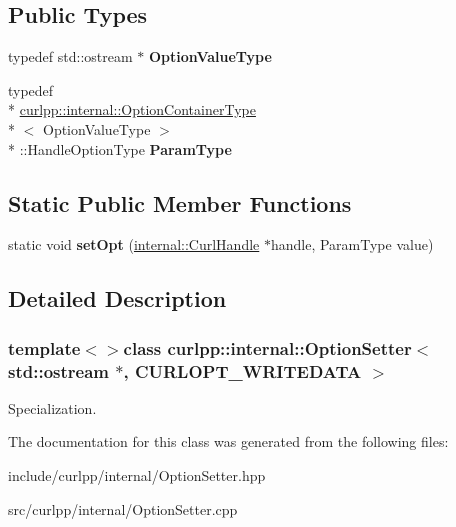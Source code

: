 \subsection*{Public Types}
\begin{DoxyCompactItemize}
\item 
\hypertarget{classcurlpp_1_1internal_1_1OptionSetter_3_01std_1_1ostream_01_5_00_01CURLOPT__WRITEDATA_01_4_a1efda9077d2d9c808c05cba30e6f5d4e}{typedef std\-::ostream $\ast$ {\bfseries Option\-Value\-Type}}\label{classcurlpp_1_1internal_1_1OptionSetter_3_01std_1_1ostream_01_5_00_01CURLOPT__WRITEDATA_01_4_a1efda9077d2d9c808c05cba30e6f5d4e}

\item 
\hypertarget{classcurlpp_1_1internal_1_1OptionSetter_3_01std_1_1ostream_01_5_00_01CURLOPT__WRITEDATA_01_4_afcb70fb62ef159e53a98c53311b67cac}{typedef \\*
\hyperlink{structcurlpp_1_1internal_1_1OptionContainerType}{curlpp\-::internal\-::\-Option\-Container\-Type}\\*
$<$ Option\-Value\-Type $>$\\*
\-::Handle\-Option\-Type {\bfseries Param\-Type}}\label{classcurlpp_1_1internal_1_1OptionSetter_3_01std_1_1ostream_01_5_00_01CURLOPT__WRITEDATA_01_4_afcb70fb62ef159e53a98c53311b67cac}

\end{DoxyCompactItemize}
\subsection*{Static Public Member Functions}
\begin{DoxyCompactItemize}
\item 
\hypertarget{classcurlpp_1_1internal_1_1OptionSetter_3_01std_1_1ostream_01_5_00_01CURLOPT__WRITEDATA_01_4_a28c62d6ced45a211c712d67830e9af73}{static void {\bfseries set\-Opt} (\hyperlink{classcurlpp_1_1internal_1_1CurlHandle}{internal\-::\-Curl\-Handle} $\ast$handle, Param\-Type value)}\label{classcurlpp_1_1internal_1_1OptionSetter_3_01std_1_1ostream_01_5_00_01CURLOPT__WRITEDATA_01_4_a28c62d6ced45a211c712d67830e9af73}

\end{DoxyCompactItemize}


\subsection{Detailed Description}
\subsubsection*{template$<$$>$class curlpp\-::internal\-::\-Option\-Setter$<$ std\-::ostream $\ast$, C\-U\-R\-L\-O\-P\-T\-\_\-\-W\-R\-I\-T\-E\-D\-A\-T\-A $>$}

Specialization. 

The documentation for this class was generated from the following files\-:\begin{DoxyCompactItemize}
\item 
include/curlpp/internal/Option\-Setter.\-hpp\item 
src/curlpp/internal/Option\-Setter.\-cpp\end{DoxyCompactItemize}
